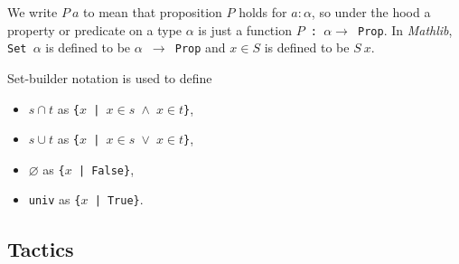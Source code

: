 \documentclass[a4paper]{article}
\begin{document}

We write $P\ a$ to mean that proposition $P$ holds for $a : \alpha$, so under the hood a property or predicate on a type $\alpha$ is just a function \texttt{$P$\ :\ $\alpha \to$ Prop}.
In \emph{Mathlib}, \texttt{Set $\alpha$} is defined to be \texttt{$\alpha$ $\to$ Prop} and $x \in S$ is defined to be $S\ x$.

Set-builder notation is used to define
\begin{itemize}
    \item $s \cap t$ as \texttt{\{$x$ | $x \in s$ $\wedge$ $x \in t$\}},
    \item $s \cup t$ as \texttt{\{$x$ | $x \in s$ $\vee$ $x \in t$\}},
    \item $\varnothing$ as \texttt{\{$x$ | False\}},
    \item \texttt{univ} as \texttt{\{$x$ | True\}}.
\end{itemize}

\subsection*{Tactics}
\end{document}
